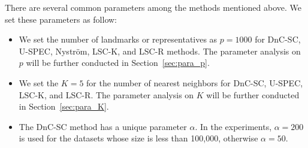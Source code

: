 There are several common parameters among the methods mentioned above. We set these parameters as follow:
\begin{itemize}
  \item We set the number of landmarks or representatives as $p=1000$ for DnC-SC, U-SPEC, Nystr\"{o}m, LSC-K, and LSC-R methods. The parameter analysis on $p$ will be further conducted in Section~\ref{sec:para_p}.
  \item We set the $K=5$ for the number of nearest neighbors for DnC-SC, U-SPEC, LSC-K, and LSC-R.
        The parameter analysis on $K$ will be further conducted in Section~\ref{sec:para_K}.
  \item The DnC-SC method has a unique parameter $\alpha$. In the experiments, $\alpha = 200$ is used for the datasets whose size is less than 100,000, otherwise $\alpha=50$.
\end{itemize}


